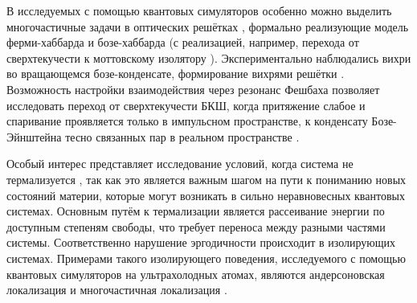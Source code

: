 В исследуемых с помощью квантовых симуляторов особенно можно выделить многочастичные задачи в оптических решётках \cite{bloch_many-body_2008}, формально реализующие модель ферми-хаббарда и бозе-хаббарда (с реализацией, например, перехода от сверхтекучести к моттовскому изолятору \cite{Greiner2002}). Экспериментально наблюдались вихри во вращающемся бозе-конденсате, формирование вихрями решётки \cite{Klaus_2022}.  Возможность настройки взаимодействия через резонанс Фешбаха позволяет исследовать переход от сверхтекучести БКШ, когда притяжение слабое и спаривание проявляется только в импульсном пространстве, к конденсату Бозе-Эйнштейна тесно связанных пар в реальном пространстве \cite{bloch_many-body_2008}.

Особый интерес представляет исследование условий, когда система не термализуется \cite{abanin_colloquium_2019}, так как это является важным шагом на пути к пониманию новых состояний материи, которые могут возникать в сильно неравновесных квантовых системах. Основным путём к термализации является рассеивание энергии по доступным степеням свободы, что требует переноса между разными частями системы. Соответственно нарушение эргодичности происходит в изолирующих системах. Примерами такого изолирующего поведения, исследуемого с помощью квантовых симуляторов на ультрахолодных атомах, являются андерсоновская локализация \cite{roati_anderson_2008} и многочастичная локализация \cite{choi_exploring_2016}.
